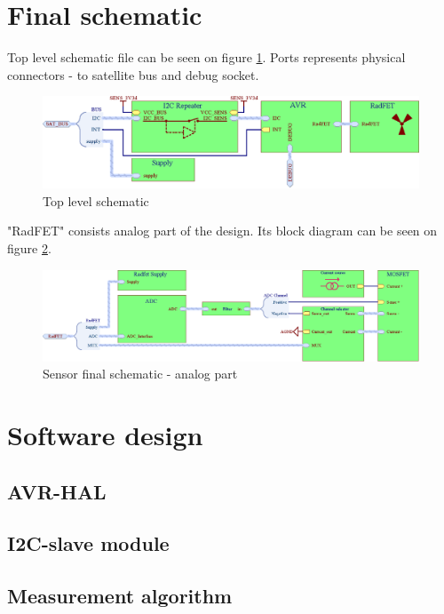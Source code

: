 \section{Final schematic}
    Top level schematic file can be seen on figure \ref{top_level_schematic}. Ports represents physical connectors - to satellite bus and debug socket.

    \begin{figure}[H]
        \centering
        \includegraphics[width=0.8\paperwidth]{img/06/final_schematic_top.eps}
        \caption{Top level schematic}
        \label{top_level_schematic}
    \end{figure}

    "RadFET" consists analog part of the design. Its block diagram can be seen on figure \ref{analog_schematic}.

    \begin{figure}[H]
        \centering
        \includegraphics[width=0.8\paperwidth]{img/06/final_schematic_radfet.eps}
        \caption{Sensor final schematic - analog part}
        \label{analog_schematic}
    \end{figure}


\section{Software design}
    \subsection{AVR-HAL}
    \subsection{I2C-slave module}
    \subsection{Measurement algorithm}

